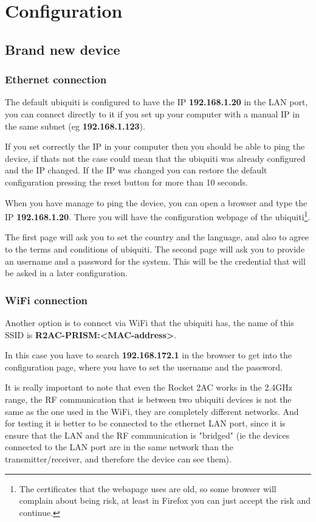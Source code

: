 \section{Configuration}

\subsection{Brand new device}

\subsubsection{Ethernet connection}
The default ubiquiti is configured to have the IP \textbf{192.168.1.20} in the LAN port, you can connect directly to it if you set up your computer with a manual IP in the same subnet (eg \textbf{192.168.1.123}).


If you set correctly the IP in your computer then you should be able to ping the device, if thats not the case could mean that the ubiquiti was already configured and the IP changed. If the IP was changed you can restore the default configuration pressing the reset button for more than 10 seconds.


When you have manage to ping the device, you can open a browser and type the IP \textbf{192.168.1.20}. There you will have the configuration webpage of the ubiquiti\footnote{The certificates that the webapage uses are old, so some browser will complain about being risk, at least in Firefox you can just accept the risk and continue.}.

The first page will ask you to set the country and the language, and also to agree to the terms and conditions of ubiquiti.
The second page will ask you to provide an username and a password for the system. This will be the credential that will be asked in a later configuration.


\subsubsection{WiFi connection}

Another option is to connect via WiFi that the ubiquiti has, the name of this SSID is \textbf{R2AC-PRISM:<MAC-address>}. 

In this case you have to search \textbf{192.168.172.1} in the browser to get into the configuration page, where you have to set the username and the password.

It is really important to note that even the Rocket 2AC works in the 2.4GHz range, the RF communication that is between two ubiquiti devices is not the same as the one used in the WiFi, they are completely different networks. And for testing it is better to be connected to the ethernet LAN port, since it is ensure that the LAN and the RF communication is "bridged" (ie the devices connected to the LAN port are in the same network than the transmitter/receiver, and therefore the device can see them).








